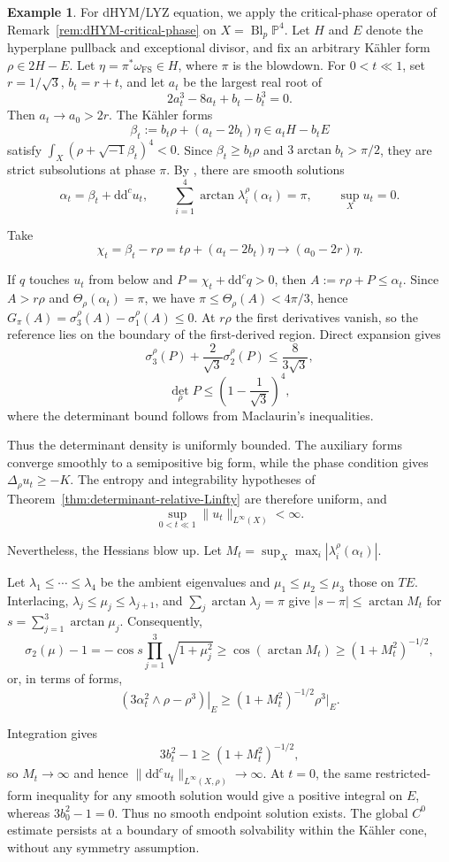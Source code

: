 \documentclass[oneside,english,letterpaper]{amsart}
\numberwithin{equation}{section}
\theoremstyle{plain}
\theoremstyle{definition}
\newtheorem{example}[thm]{Example}
\theoremstyle{remark}
\renewcommand{\d}{\mathrm{d}}
\newcommand{\ddc}{\d\d^c}
\begin{document}
\begin{example}
\label{ex:dHYM-critical-degeneration}
For dHYM/LYZ equation, we apply the critical-phase operator of
Remark~\ref{rem:dHYM-critical-phase} on
$X=\operatorname{Bl}_p\mathbb P^4$. Let $H$ and $E$ denote the
hyperplane pullback and exceptional divisor, and fix an arbitrary
K\"ahler form $\rho\in2H-E$. Let
$\eta=\pi^*\omega_{\mathrm{FS}}\in H$, where $\pi$ is the blowdown.
For $0<t\ll1$, set $r=1/\sqrt3$, $b_t=r+t$, and let $a_t$ be the
largest real root of
\[
2a_t^3-8a_t+b_t-b_t^3=0.
\]
Then $a_t\to a_0>2r$. The K\"ahler forms
$$
\beta_t:=b_t\rho+(a_t-2b_t)\eta\in a_tH-b_tE
$$
satisfy $\int_X(\rho+\sqrt{-1}\beta_t)^4<0$.
Since $\beta_t\geq b_t\rho$ and $3\arctan b_t>\pi/2$, they are
strict subsolutions at phase $\pi$. By
\cite[Theorem~1.1]{fu2026criticallyzequationkahler}, there are smooth solutions
$$
\alpha_t=\beta_t+\ddc u_t,\qquad
\sum_{i=1}^4\arctan\lambda_i^\rho(\alpha_t)=\pi,
\qquad \sup_Xu_t=0.
$$

Take
$$
\chi_t=\beta_t-r\rho
=t\rho+(a_t-2b_t)\eta
\longrightarrow(a_0-2r)\eta.
$$

If $q$ touches $u_t$ from below and $P=\chi_t+\ddc q>0$, then
$A:=r\rho+P\leq\alpha_t$. Since $A>r\rho$ and
$\Theta_\rho(\alpha_t)=\pi$, we have
$\pi\leq\Theta_\rho(A)<4\pi/3$, hence
$G_\pi(A)=\sigma_3^\rho(A)-\sigma_1^\rho(A)\leq0$.
At $r\rho$ the first derivatives vanish, so the reference lies on
the boundary of the first-derived region. Direct expansion gives
\[
\sigma_3^\rho(P)+\frac2{\sqrt3}\sigma_2^\rho(P)
\leq\frac8{3\sqrt3},\] \[
\det_\rho P\leq\left(1-\frac1{\sqrt3}\right)^4,
\]
where the determinant bound follows from Maclaurin's inequalities.


Thus the determinant density is uniformly bounded. The auxiliary
forms converge smoothly to a semipositive big form, while the phase
condition gives $\Delta_\rho u_t\geq-K$. The entropy and integrability
hypotheses of Theorem~\ref{thm:determinant-relative-Linfty} are therefore uniform,
and
$$
\sup_{0<t\ll1}\|u_t\|_{L^\infty(X)}<\infty.
$$

Nevertheless, the Hessians blow up. Let
$M_t=\sup_X\max_i|\lambda_i^\rho(\alpha_t)|$.

Let $\lambda_1\leq\cdots\leq\lambda_4$ be the ambient eigenvalues
and $\mu_1\leq\mu_2\leq\mu_3$ those on $TE$.
Interlacing, $\lambda_j\leq\mu_j\leq\lambda_{j+1}$, and
$\sum_j\arctan\lambda_j=\pi$ give
$|s-\pi|\leq\arctan M_t$ for $s=\sum_{j=1}^3\arctan\mu_j$.
Consequently,
\[
\sigma_2(\mu)-1
=-\cos s\prod_{j=1}^3\sqrt{1+\mu_j^2}\geq \cos (\arctan M_t)
\geq(1+M_t^2)^{-1/2},
\]
or, in terms of forms,
\[
\left.(3\alpha_t^2\wedge\rho-\rho^3)\right|_E
\geq(1+M_t^2)^{-1/2}\rho^3|_E.
\]


Integration gives
$$
3b_t^2-1\geq(1+M_t^2)^{-1/2},
$$
so $M_t\to\infty$ and hence
$\|\ddc u_t\|_{L^\infty(X,\rho)}\to\infty$.
{At $t=0$, the same restricted-form inequality for any smooth
solution would give a positive integral on $E$, whereas
$3b_0^2-1=0$. Thus no smooth endpoint solution exists.} The global $C^0$ estimate
persists at a boundary of smooth solvability within the K\"ahler
cone, without any symmetry assumption.
\end{example}
\end{document}
